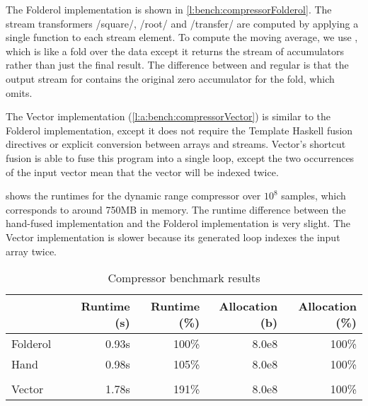 The Folderol implementation is shown in \cref{l:bench:compressorFolderol}.
The stream transformers \Hs/square/, \Hs/root/ and \Hs/transfer/ are computed by applying a single function to each stream element.
To compute the moving average, we use \Hs@postscanl@, which is like a fold over the data except it returns the stream of accumulators rather than just the final result.
The difference between \Hs@postscanl@ and regular \Hs@scanl@ is that the output stream for \Hs@scanl@ contains the original zero accumulator for the fold, which \Hs@postscanl@ omits.

The Vector implementation (\cref{l:a:bench:compressorVector}) is similar to the Folderol implementation, except it does not require the Template Haskell fusion directives or explicit conversion between arrays and streams.
Vector's shortcut fusion is able to fuse this program into a single loop, except the two occurrences of the input vector mean that the vector will be indexed twice.

 shows the runtimes for the dynamic range compressor over $10^8$ samples, which corresponds to around 750MB in memory.
The runtime difference between the hand-fused implementation and the Folderol implementation is very slight. 
The Vector implementation is slower because its generated loop indexes the input array twice.

\begin{table}
\begin{center}
\begin{tabular}{ll|rrrr}
& & Runtime (s)  & Runtime (\%) & Allocation (b) & Allocation (\%) \\
\hline
Folderol &          & 0.93s &   100\% & 8.0e8 & 100\% \\
Hand     &          & 0.98s &   105\% & 8.0e8 & 100\% \\
&&&\\
Vector &            & 1.78s &   191\% & 8.0e8 & 100\%\\
\end{tabular}
\end{center}
\caption[Compressor benchmark results]{Compressor benchmark results}
\label{table:bench:compressor}
\end{table}

